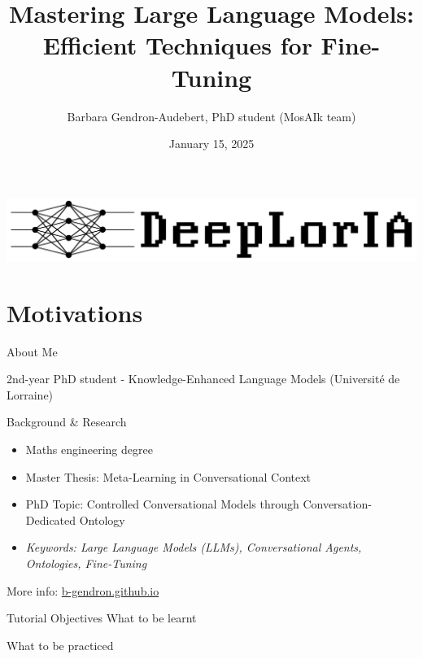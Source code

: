 \documentclass[11pt,aspectratio=169]{beamer}
\author[Barbara Gendron]{\large Barbara Gendron-Audebert, PhD student (MosAIk team)}
\title[Mastering LLM Fine-Tuning]{\huge Mastering Large Language Models: Efficient Techniques for Fine-Tuning}
\date{January 15, 2025}
\institute[DeepLorIA tutorial]{\large LORIA, Université de Lorraine, CNRS\\ DeepLorIA Network}
\begin{document}
\begin{frame}[plain]
    \vspace*{5pt}
    \begin{center}
        \includegraphics[scale=0.35]{DeepLorIA_logo1.png}
    \end{center}
    \titlepage
\end{frame}

\section{Motivations}

\begin{frame}{About Me}
\begin{center}
    2nd-year PhD student - Knowledge-Enhanced Language Models (Université de Lorraine)
\end{center}
\vspace*{10pt}
Background \& Research
    \begin{itemize}
        \item Maths engineering degree
        \item Master Thesis: Meta-Learning in Conversational Context
        \item PhD Topic: Controlled Conversational Models through Conversation-Dedicated Ontology
        \item \textsl{Keywords: Large Language Models (LLMs), Conversational Agents, Ontologies, Fine-Tuning}
    \end{itemize}

More info: \url{b-gendron.github.io}
\end{frame}

\begin{frame}{Tutorial Objectives}
What to be learnt

What to be practiced
\end{frame}
\end{document}
